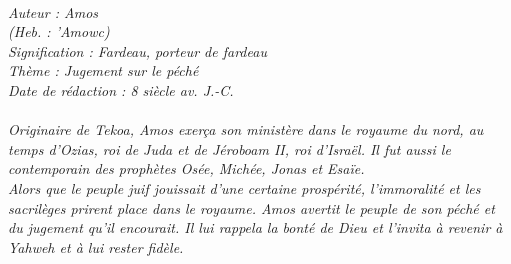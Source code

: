 \BFont
\noindent\hrulefill
{\footnotesize
\textit{
\bigskip
{\centering{}
\\Auteur : Amos
\\(Heb. : 'Amowc)
\\Signification : Fardeau, porteur de fardeau
\\Thème : Jugement sur le péché
\\Date de rédaction : 8 siècle av. J.-C.\\}
}
\textit{
\\Originaire de Tekoa, Amos exerça son ministère dans le royaume du nord, au temps d'Ozias, roi de Juda et de Jéroboam II, roi d'Israël. Il fut aussi le contemporain des prophètes Osée, Michée, Jonas et Esaïe.
\\Alors que le peuple juif jouissait d'une certaine prospérité, l'immoralité et les sacrilèges prirent place dans le royaume. Amos avertit le peuple de son péché et du jugement qu'il encourait. Il lui rappela la bonté de Dieu et l'invita à revenir à Yahweh et à lui rester fidèle.\bigskip
}
}
\par\nobreak\noindent\hrulefill
